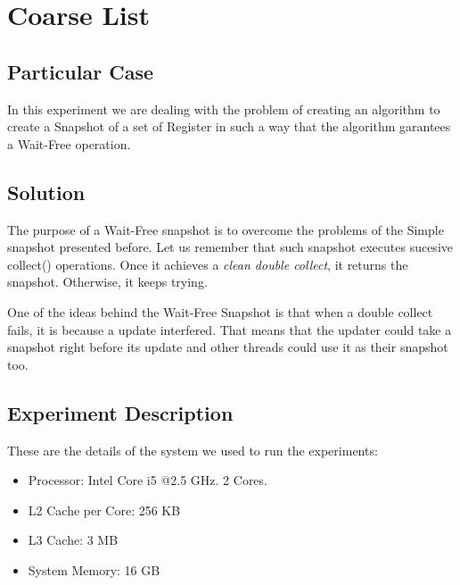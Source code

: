 \section{\textbf{Coarse List}}
\subsection{Particular Case}
\par
In this experiment we are dealing with the problem of creating an algorithm to
create a Snapshot of a set of Register in such a way that the algorithm
garantees a Wait-Free operation.
\par
\subsection{Solution}
\par
The purpose of a Wait-Free snapshot is to overcome the problems of the Simple snapshot presented before. Let us remember that such snapshot executes sucesive collect() operations. Once it achieves a \textit{clean double collect}, it returns the snapshot. Otherwise, it keeps trying. 
\par
One of the ideas behind the Wait-Free Snapshot is that when a double collect fails, it is because a update interfered. That means that the updater could take a snapshot right before its update and other threads could use it as their snapshot too. 
\par
\subsection{Experiment Description}
\par

\par
These are the details of the system we used to run the experiments:
\begin{itemize}
\item Processor: Intel Core i5 @2.5 GHz. 2 Cores.
\item L2 Cache per Core: 256 KB
\item L3 Cache: 3 MB
\item System Memory: 16 GB
\end{itemize}
